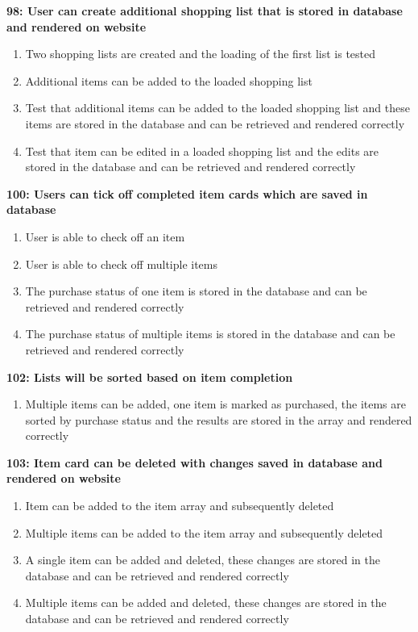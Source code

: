\documentclass[10pt,onecolumn]{witseiepaper}
\begin{document}
%

\textbf{98: User can create additional shopping list that is stored in database and rendered on website}

\begin{enumerate}
	\item Two shopping lists are created and the loading of the first list is tested
	\item Additional items can be added to the loaded shopping list
	\item Test that additional items can be added to the loaded shopping list and these items are stored in the database and can be retrieved and rendered correctly
	\item Test that item can be edited in a loaded shopping list and the edits are stored in the database and can be retrieved and rendered correctly
\end{enumerate}

\textbf{100: Users can tick off completed item cards which are saved in database}

\begin{enumerate}
	\item User is able to check off an item
	\item User is able to check off multiple items 
	\item The purchase status of one item is stored in the database and can be retrieved and rendered correctly 
	\item The purchase status of multiple items is stored in the database and can be retrieved and rendered correctly
\end{enumerate}

\textbf{102: Lists will be sorted based on item completion}

\begin{enumerate}
	\item Multiple items can be added, one item is marked as purchased, the items are sorted by purchase status and the results are stored in the array and rendered correctly
\end{enumerate}

\textbf{103: Item card can be deleted with changes saved in database and rendered on website}

\begin{enumerate}
	\item Item can be added to the item array and subsequently deleted
	\item Multiple items can be added to the item array and subsequently deleted
	\item A single item can be added and deleted, these changes are stored in the database and can be retrieved and rendered correctly
	\item Multiple items can be added and deleted, these changes are stored in the database and can be retrieved and rendered correctly
\end{enumerate}
\end{document}
